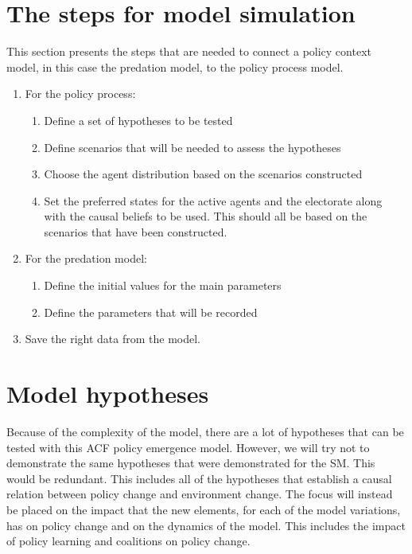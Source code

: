 \documentclass[12pt]{article}
\begin{document}
\section{The steps for model simulation}
\label{sec:steps}

This section presents the steps that are needed to connect a policy context model, in this case the predation model, to the policy process model.

\begin{enumerate}
\item For the policy process:
	\begin{enumerate}
	\item Define a set of hypotheses to be tested
	\item Define scenarios that will be needed to assess the hypotheses
	\item Choose the agent distribution based on the scenarios constructed
	\item Set the preferred states for the active agents and the electorate along with the causal beliefs to be used. This should all be based on the scenarios that have been constructed.
	\end{enumerate}

\item For the predation model:
	\begin{enumerate}
	\item Define the initial values for the main parameters
	\item Define the parameters that will be recorded
	\end{enumerate}
\item Save the right data from the model.
\end{enumerate}

\section{Model hypotheses}
\label{sec:hypotheses}

Because of the complexity of the model, there are a lot of hypotheses that can be tested with this ACF policy emergence model. However, we will try not to demonstrate the same hypotheses that were demonstrated for the SM. This would be redundant. This includes all of the hypotheses that establish a causal relation between policy change and environment change. The focus will instead be placed on the impact that the new elements, for each of the model variations, has on policy change and on the dynamics of the model. This includes the impact of policy learning and coalitions on policy change.
\end{document}

